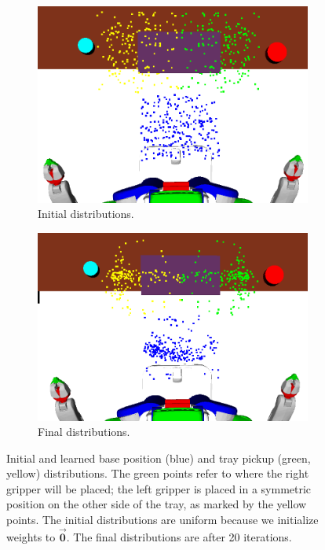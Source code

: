 \begin{figure}
  \centering
  \begin{subfigure}[b]{0.45\linewidth}
    \includegraphics[width=\textwidth]{images/dinner_tray_initial.png}
    \caption{Initial distributions.}
  \end{subfigure}
  \begin{subfigure}[b]{0.45\linewidth}
    \includegraphics[width=\textwidth]{images/dinner_tray_final.png}
    \caption{Final distributions.}
  \end{subfigure}
  \caption{\small{Initial and learned base position (blue) and tray pickup (green, yellow) distributions.
The green points refer to where the right gripper will be placed; the left gripper is
placed in a symmetric position on the other side of the tray, as marked by the yellow points. The
initial distributions are uniform because we initialize weights to $\vec{\mathbf{0}}$.
The final distributions are after 20 iterations.}}
  \label{fig:dinner}
  \vspace{-1.5 em}
\end{figure}

